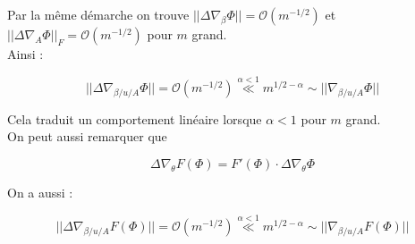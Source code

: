 \documentclass[a4paper, 11pt, french]{article}
\theoremstyle{definition}
\begin{document}
\begin{itemize}
	Par la même démarche on trouve $||\Delta \nabla_{\beta} \Phi|| = \mathcal{O}(m^{-1/2})$ et $||\Delta \nabla_{A} \Phi||_F = \mathcal{O}(m^{-1/2})$ pour $m$ grand. \\
	
	Ainsi :
	
	\[||\Delta \nabla_{\beta / u / A} \Phi|| = \mathcal{O}(m^{-1/2}) \stackrel{\alpha < 1}{\ll} m^{1/2 - \alpha} \sim ||\nabla_{\beta / u / A} \Phi||\]
	
	Cela traduit un comportement linéaire lorsque $\alpha < 1$ pour $m$ grand. \\
	
	On peut aussi remarquer que
	
	\[\Delta \nabla_{\theta} F(\Phi) =  F'(\Phi) \cdot \Delta \nabla_{\theta} \Phi \]
	
	On a aussi :

	\[||\Delta \nabla_{\beta / u / A} F(\Phi) || = \mathcal{O}(m^{-1/2}) \stackrel{\alpha < 1}{\ll} m^{1/2 - \alpha} \sim ||\nabla_{\beta / u / A} F(\Phi)||\]

	
		
	\end{itemize}


	
	
\end{document}
